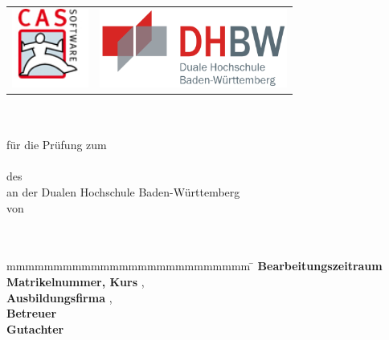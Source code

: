 \begin{titlepage}
	\begin{longtable}{p{} p{}}
	  {\includegraphics[height=2.6cm]{images/cas.png}} & 
	  {\includegraphics[height=2.6cm]{images/dhbw.png}}
	\end{longtable}
	\enlargethispage{20mm}
	\begin{center}
	  \vspace*{12mm}	{\LARGE\bf \titel }\\
	  \vspace*{12mm}	{\large\bf \arbeit}\\
	  \vspace*{12mm}	für die Prüfung zum\\
	  \vspace*{3mm} 	{\bf \abschluss}\\
	  \vspace*{12mm}	des \studiengang\\
	  \vspace*{3mm} 	an der Dualen Hochschule Baden-Württemberg \dhbw\\
	  \vspace*{12mm}	von\\
	  \vspace*{3mm} 	{\large\bf \autor}\\
	  \vspace*{12mm}	\datumAbgabe\\
	\end{center}
	\vfill
	\begin{spacing}{1.2}
	\begin{tabbing}
		mmmmmmmmmmmmmmmmmmmmmmmmmm     \= \kill
		\textbf{Bearbeitungszeitraum}  \>  \zeitraum\\
		\textbf{Matrikelnummer, Kurs}  \>  \martrikelnr, \kurs\\
		\textbf{Ausbildungsfirma}      \>  \firma, \firmenort\\
		\textbf{Betreuer}              \>  \betreuer\\
		\textbf{Gutachter}             \>  \gutachter
	\end{tabbing}
	\end{spacing}
\end{titlepage}
